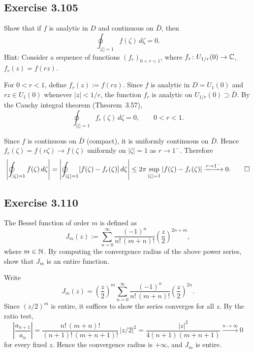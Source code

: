 \documentclass{article}
\begin{document}
\subsection{Exercise 3.105}

Show that if $f$ is analytic in $D$ and continuous on $\bar{D}$, then
\[
  \oint_{|\zeta|=1} f(\zeta)\,d\zeta = 0.
\]
Hint: Consider a sequence of functions $(f_r)_{0<r<1}$,
where $f_r \colon U_{1/r}(0) \to \mathbb{C}$,
$f_r(z) = f(rz)$.

\begin{solution}
  For $0 < r < 1$, define $f_r(z) := f(rz)$.
  Since $f$ is analytic in $D = U_1(0)$ and $rz \in U_1(0)$
  whenever $|z| < 1/r$, the function $f_r$ is analytic on
  $U_{1/r}(0) \supset \bar{D}$.
  By the Cauchy integral theorem (Theorem~3.57),
  \[
    \oint_{|\zeta|=1} f_r(\zeta)\,d\zeta = 0,
    \qquad 0 < r < 1.
  \]

  Since $f$ is continuous on $\bar{D}$ (compact), it is uniformly
  continuous on $\bar{D}$.
  Hence $f_r(\zeta) = f(r\zeta) \to f(\zeta)$ uniformly on
  $|\zeta| = 1$ as $r \to 1^-$.
  Therefore
  \[
    \left|\oint_{|\zeta|=1} f(\zeta)\,d\zeta\right|
    = \left|\oint_{|\zeta|=1} [f(\zeta) - f_r(\zeta)]\,d\zeta\right|
    \le 2\pi\sup_{|\zeta|=1}|f(\zeta) - f_r(\zeta)|
    \xrightarrow{r\to 1^-}0.\qedhere
  \]
\end{solution}

\subsection{Exercise 3.110}

The Bessel function of order $m$ is defined as
\[
  J_m(z) := \sum_{n=0}^{\infty}
  \frac{(-1)^n}{n!\,(m+n)!}
  \left(\frac{z}{2}\right)^{2n+m},
\]
where $m \in \mathbb{N}$.
By computing the convergence radius of the above
power series, show that $J_m$ is an entire function.

\begin{solution}
  Write
  \[
    J_m(z) = \left(\frac{z}{2}\right)^{\!m}
    \sum_{n=0}^{\infty}
    \frac{(-1)^n}{n!\,(m+n)!}\left(\frac{z}{2}\right)^{\!2n}.
  \]
  Since $(z/2)^m$ is entire, it suffices to show the series
  converges for all $z$.
  By the ratio test,
  \[
    \left|\frac{a_{n+1}}{a_n}\right|
    = \frac{n!\,(m+n)!}{(n+1)!\,(m+n+1)!}\,|z/2|^2
    = \frac{|z|^2}{4(n+1)(m+n+1)}
    \xrightarrow{n\to\infty}0
  \]
  for every fixed $z$.
  Hence the convergence radius is $+\infty$, and $J_m$ is entire.\qedhere
\end{solution}
\end{document}
